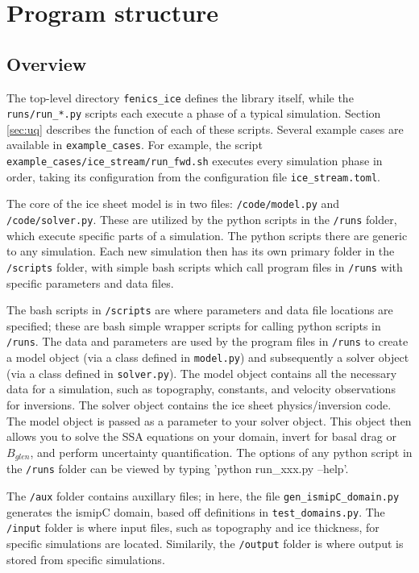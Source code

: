 \documentclass[11pt, reqno, nocenter]{article}
\begin{document}
\section{Program structure}

\subsection{Overview}

The top-level directory {\tt fenics\_ice} defines the library itself, while the {\tt runs/run\_*.py} scripts each execute a phase of a typical simulation. Section \ref{sec:uq} describes the function of each of these scripts. Several example cases are available in {\tt example\_cases}. For example, the script {\tt example\_cases/ice\_stream/run\_fwd.sh} executes every simulation phase in order, taking its configuration from the configuration file {\tt ice\_stream.toml}.

The core of the ice sheet model is in two files: {\tt /code/model.py} and {\tt /code/solver.py}. These are utilized by the python scripts in the {\tt /runs} folder, which execute specific parts of a simulation. The python scripts there are generic to any simulation. Each new simulation then has its own primary folder in the {\tt /scripts} folder, with simple bash scripts which call program files in {\tt /runs} with specific parameters and data files.

The bash scripts in {\tt /scripts} are where parameters and data file locations are specified; these are bash simple wrapper scripts for calling python scripts in {\tt /runs}. The data and parameters are used by the program files in {\tt /runs} to create a model object (via a class defined in {\tt model.py}) and subsequently a solver object (via a class defined in {\tt solver.py}). The model object contains all the necessary data for a simulation, such as topography, constants, and velocity observations for inversions. The solver object contains the ice sheet physics/inversion code. The model object is passed as a parameter to your solver object. This object then allows you to solve the SSA equations \cite{MacAyeal1989} on your domain, invert for basal drag or $B_{glen}$, and perform uncertainty quantification. The options of any python script in the {\tt /runs} folder can be viewed by typing 'python run\_xxx.py --help'.


The {\tt /aux} folder contains auxillary files; in here, the file {\tt gen\_ismipC\_domain.py} generates the ismipC domain,  based off definitions in {\tt test\_domains.py}. The {\tt /input} folder is where input files, such as topography and ice thickness, for specific simulations are located. Similarily, the {\tt /output} folder is where output is stored from specific simulations.
\end{document}
